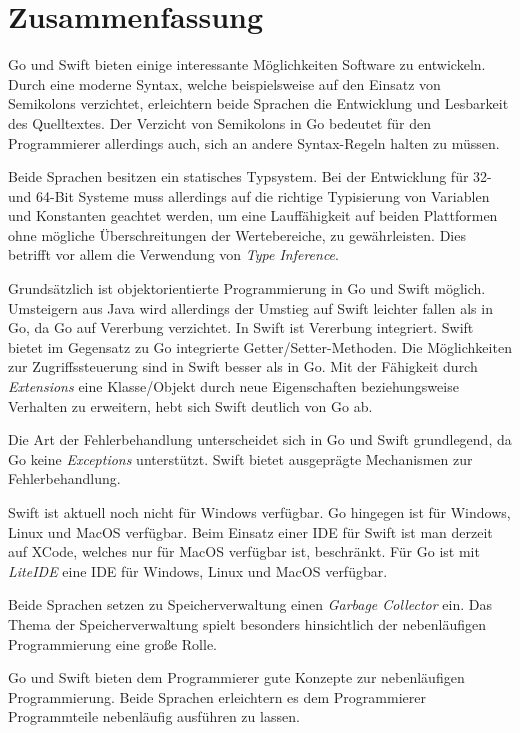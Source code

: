 \chapter{Zusammenfassung}
Go und Swift bieten einige interessante Möglichkeiten Software zu entwickeln.
Durch eine moderne Syntax, welche beispielsweise auf den Einsatz von Semikolons verzichtet,
erleichtern beide Sprachen die Entwicklung und Lesbarkeit des Quelltextes.
Der Verzicht von Semikolons in Go bedeutet für den Programmierer allerdings auch, sich an andere Syntax-Regeln halten zu müssen.

Beide Sprachen besitzen ein statisches Typsystem.
Bei der Entwicklung für 32- und 64-Bit Systeme muss allerdings auf die richtige Typisierung von Variablen und Konstanten geachtet werden, um eine Lauffähigkeit auf beiden Plattformen ohne mögliche Überschreitungen der Wertebereiche, zu gewährleisten.
Dies betrifft vor allem die Verwendung von \textit{Type Inference}.

Grundsätzlich ist objektorientierte Programmierung in Go und Swift möglich.
Umsteigern aus Java wird allerdings der Umstieg auf Swift leichter fallen als in Go, da Go auf Vererbung verzichtet.
In Swift ist Vererbung integriert.
Swift bietet im Gegensatz zu Go integrierte Getter/Setter-Methoden.
Die Möglichkeiten zur Zugriffssteuerung sind in Swift besser als in Go.
Mit der Fähigkeit durch \textit{Extensions} eine Klasse/Objekt durch neue Eigenschaften beziehungsweise Verhalten zu erweitern, hebt sich Swift deutlich von Go ab.

Die Art der Fehlerbehandlung unterscheidet sich in Go und Swift grundlegend, da Go keine \textit{Exceptions} unterstützt.
Swift bietet ausgeprägte Mechanismen zur Fehlerbehandlung.

Swift ist aktuell noch nicht für Windows verfügbar. 
Go hingegen ist für Windows, Linux und MacOS verfügbar.
Beim Einsatz einer \gls{IDE} für Swift ist man derzeit auf XCode, welches nur für MacOS verfügbar ist, beschränkt.
Für Go ist mit \textit{LiteIDE} eine \gls{IDE} für Windows, Linux und MacOS verfügbar.

Beide Sprachen setzen zu Speicherverwaltung einen \textit{Garbage Collector} ein.
Das Thema der Speicherverwaltung spielt besonders hinsichtlich der nebenläufigen Programmierung eine große Rolle.

Go und Swift bieten dem Programmierer gute Konzepte zur nebenläufigen Programmierung. 
Beide Sprachen erleichtern es dem Programmierer Programmteile nebenläufig ausführen zu lassen.

